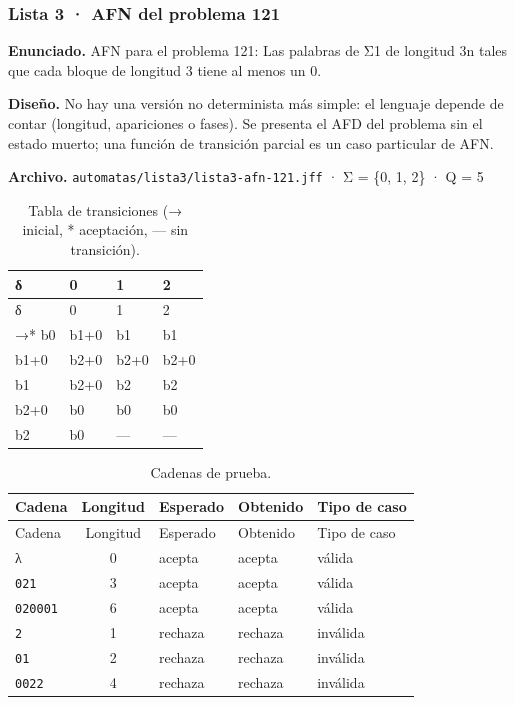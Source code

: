 
\hypertarget{lista-3-afn-del-problema-121}{%
\subsubsection{Lista 3 · AFN del problema 121}\label{lista-3-afn-del-problema-121}}

\textbf{Enunciado.} AFN para el problema 121: Las palabras de Σ1 de longitud 3n tales que cada bloque de longitud 3 tiene al menos un 0.

\textbf{Diseño.} No hay una versión no determinista más simple: el lenguaje depende de contar (longitud, apariciones o fases). Se presenta el AFD del problema sin el estado muerto; una función de transición parcial es un caso particular de AFN.

\textbf{Archivo.} \texttt{automatas/lista3/lista3-afn-121.jff} · Σ = \{0, 1, 2\} · \textbar Q\textbar{} = 5

\begin{longtable}[]{@{}llll@{}}
\caption{Tabla de transiciones (→ inicial, * aceptación, --- sin transición).}\tabularnewline
\toprule\noalign{}
δ & 0 & 1 & 2 \\
\midrule\noalign{}
\endfirsthead
\toprule\noalign{}
δ & 0 & 1 & 2 \\
\midrule\noalign{}
\endhead
\bottomrule\noalign{}
\endlastfoot
→* b0 & b1+0 & b1 & b1 \\
b1+0 & b2+0 & b2+0 & b2+0 \\
b1 & b2+0 & b2 & b2 \\
b2+0 & b0 & b0 & b0 \\
b2 & b0 & --- & --- \\
\end{longtable}

\begin{longtable}[]{@{}lclll@{}}
\caption{Cadenas de prueba.}\tabularnewline
\toprule\noalign{}
Cadena & Longitud & Esperado & Obtenido & Tipo de caso \\
\midrule\noalign{}
\endfirsthead
\toprule\noalign{}
Cadena & Longitud & Esperado & Obtenido & Tipo de caso \\
\midrule\noalign{}
\endhead
\bottomrule\noalign{}
\endlastfoot
λ & 0 & acepta & acepta & válida \\
\texttt{021} & 3 & acepta & acepta & válida \\
\texttt{020001} & 6 & acepta & acepta & válida \\
\texttt{2} & 1 & rechaza & rechaza & inválida \\
\texttt{01} & 2 & rechaza & rechaza & inválida \\
\texttt{0022} & 4 & rechaza & rechaza & inválida \\
\end{longtable}

